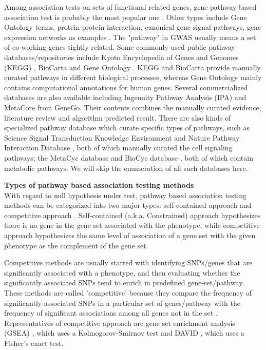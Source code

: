 \documentclass[12pt]{article}
\begin{document}
Among association tests on sets of functional related genes, gene pathway based association test is probably the most popular one \cite{DelaCruz2010,Wang2010}. Other types include Gene Ontology terms, protein-protein interaction, canonical gene signal pathways, gene expression networks as examples \cite{Sham2014,DelaCruz2010,Weng2011,Wang2010}. The "pathway" in GWAS usually means a set of co-working genes tightly related. Some commonly used public pathway databases/repositories include Kyoto Encyclopedia of Genes and Genomes (KEGG) \cite{Ogata1999}, BioCarta \cite{Nishimura2001} and Gene Ontology \cite{Ashburner2000}. KEGG and BioCarta provide manually curated pathways in different biological processes, whereas Gene Ontology mainly contains computational annotations for human genes. Several commercialized databases are also available including Ingenuity Pathway Analysis (IPA) and MetaCore from GeneGo. Their contents combines the manually curated evidence, literature review and algorithm predicted result. There are also kinds of specialized pathway database which curate specific types of pathways, such as Science Signal Transduction Knowledge Environment \cite{Gough2002} and Nature Pathway Interaction Database \cite{Schaefer2009}, both of which manually curated the cell signaling pathways; the MetaCyc database \cite{Karp2002} and BioCyc database \cite{Caspi2008}, both of which contain metabolic pathways. We will skip the enumeration of all such databases here. 

\textbf{Types of pathway based association testing methods}\\
With regard to null hypothesis under test, pathway based association testing methods can be categorized into two major types: self-contained approach and competitive approach \cite{Goeman2007,Liu2007,Nam2008,Wang2010,Fridley2010,Fridley2011}. Self-contained (a.k.a. Constrained) approach hypothesizes there is no gene in the gene set associated with the phenotype, while competitive approach hypothesizes the same level of association of a gene set with the given phenotype as the complement of the gene set. 

Competitive methods are usually started with identifying SNPs/genes that are significantly associated with a phenotype, and then evaluating whether the significantly associated SNPs tend to enrich in predefined gene-set/pathway. These methods are called 'competitive' because they compare the frequency of significantly associated SNPs in a particular set of genes/pathway with the frequency of significant associations among all genes not in the set \cite{Fridley2011}. Representatives of competitive approach are gene set enrichment analysis (GSEA) \cite{Subramanian2005}, which uses a Kolmogorov-Smirnov test and DAVID \cite{DennisJr2003}, which uses a Fisher's exact test.
\end{document}
